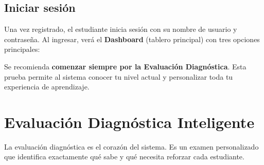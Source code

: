\documentclass[12pt, a4paper]{article}
\begin{document}
\subsection{Iniciar sesión}

Una vez registrado, el estudiante inicia sesión con su nombre de usuario y contraseña. Al ingresar, verá el \textbf{Dashboard} (tablero principal) con tres opciones principales:

\begin{center}
\end{center}

\begin{tipbox}
Se recomienda \textbf{comenzar siempre por la Evaluación Diagnóstica}. Esta prueba permite al sistema conocer tu nivel actual y personalizar toda tu experiencia de aprendizaje.
\end{tipbox}

\section{Evaluación Diagnóstica Inteligente}

La evaluación diagnóstica es el corazón del sistema. Es un examen personalizado que identifica exactamente qué sabe y qué necesita reforzar cada estudiante.
\end{document}
